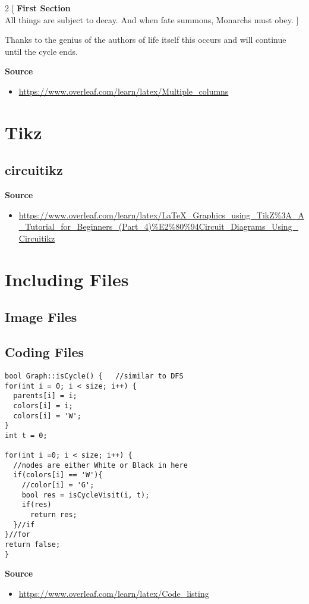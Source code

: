 \documentclass[10pt, letterpaper]{article}
\begin{document}
\begin{multicols}{2}
  [
  \noindent \textbf{First Section}\\
  All things are subject to decay. And when fate summons, Monarchs must obey.
  ]
  \blindtext
\end{multicols}
Thanks to the genius of the authors of life itself this occurs and will continue until the cycle ends.

\noindent\textbf{Source}
\begin{itemize}
  \item \url{https://www.overleaf.com/learn/latex/Multiple_columns}
\end{itemize}

\section{Tikz}
\subsection{circuitikz}
\textbf{Source}
\begin{itemize}
  \item \url{https://www.overleaf.com/learn/latex/LaTeX_Graphics_using_TikZ%3A_A_Tutorial_for_Beginners_(Part_4)%E2%80%94Circuit_Diagrams_Using_Circuitikz}
\end{itemize}

\section{Including Files}
\subsection{Image Files}
\subsection{Coding Files}
\lstset{style=basicstyle}
\begin{lstlisting}[title=Function: Graph::isCycle()]
bool Graph::isCycle() {   //similar to DFS
for(int i = 0; i < size; i++) {
  parents[i] = i;
  colors[i] = i;
  colors[i] = 'W';
}
int t = 0;

for(int i =0; i < size; i++) {
  //nodes are either White or Black in here
  if(colors[i] == 'W'){
    //color[i] = 'G';
    bool res = isCycleVisit(i, t);
    if(res)
      return res;
  }//if
}//for
return false;
}
\end{lstlisting}
\textbf{Source}
\begin{itemize}
  \item \url{https://www.overleaf.com/learn/latex/Code_listing}
\end{itemize}
\end{document}

